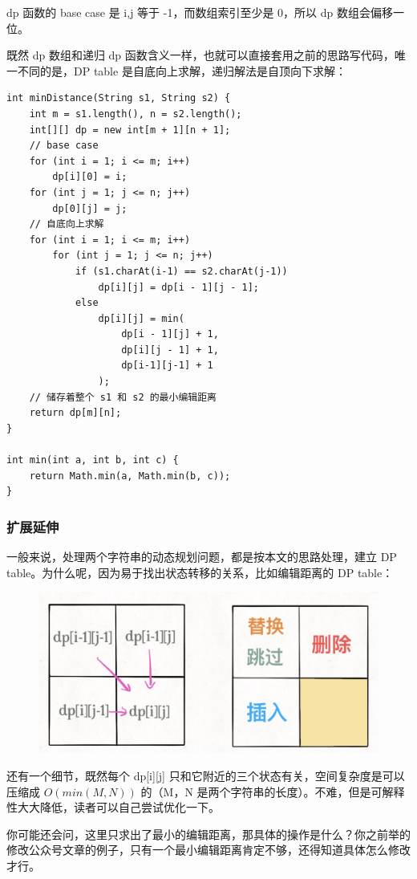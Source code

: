 \documentclass[12pt]{article}
\begin{document}
dp 函数的 base case 是 i,j 等于 -1，而数组索引至少是 0，所以 dp 数组会偏移一位。

既然 dp 数组和递归 dp 函数含义一样，也就可以直接套用之前的思路写代码，唯一不同的是，DP table 是自底向上求解，递归解法是自顶向下求解：
\begin{lstlisting}
int minDistance(String s1, String s2) {
    int m = s1.length(), n = s2.length();
    int[][] dp = new int[m + 1][n + 1];
    // base case 
    for (int i = 1; i <= m; i++)
        dp[i][0] = i;
    for (int j = 1; j <= n; j++)
        dp[0][j] = j;
    // 自底向上求解
    for (int i = 1; i <= m; i++)
        for (int j = 1; j <= n; j++)
            if (s1.charAt(i-1) == s2.charAt(j-1))
                dp[i][j] = dp[i - 1][j - 1];
            else               
                dp[i][j] = min(
                    dp[i - 1][j] + 1,
                    dp[i][j - 1] + 1,
                    dp[i-1][j-1] + 1
                );
    // 储存着整个 s1 和 s2 的最小编辑距离
    return dp[m][n];
}

int min(int a, int b, int c) {
    return Math.min(a, Math.min(b, c));
}
\end{lstlisting}

\subsubsection{扩展延伸}
一般来说，处理两个字符串的动态规划问题，都是按本文的思路处理，建立 DP table。为什么呢，因为易于找出状态转移的关系，比如编辑距离的 DP table：

\begin{figure}[H]
    \centering
    \includegraphics[width=.6\textwidth]{fig/Dynamic_Programming_Edit_Distance_3.png}
\end{figure}

还有一个细节，既然每个 dp[i][j] 只和它附近的三个状态有关，空间复杂度是可以压缩成 $O(min(M, N))$ 的（M，N 是两个字符串的长度）。不难，但是可解释性大大降低，读者可以自己尝试优化一下。

你可能还会问，这里只求出了最小的编辑距离，那具体的操作是什么？你之前举的修改公众号文章的例子，只有一个最小编辑距离肯定不够，还得知道具体怎么修改才行。
\end{document}
